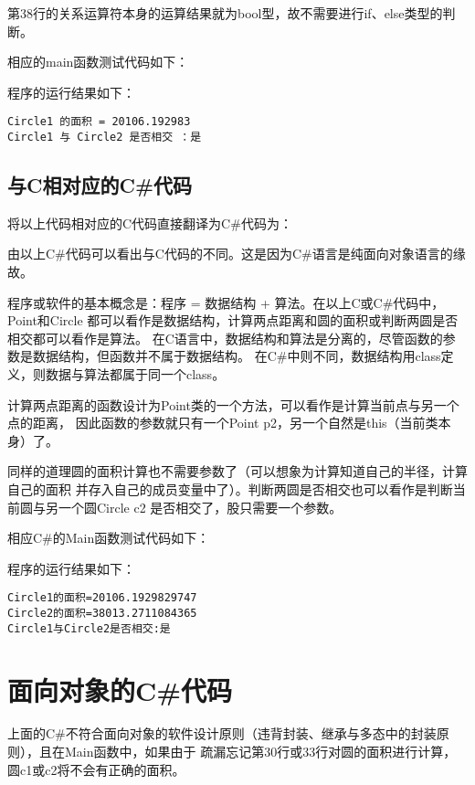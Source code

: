 第38行的关系运算符本身的运算结果就为bool型，故不需要进行if、else类型的判断。

相应的main函数测试代码如下：



程序的运行结果如下：
\begin{verbatim}
Circle1 的面积 = 20106.192983
Circle1 与 Circle2 是否相交 ：是
\end{verbatim}


\subsection{与C相对应的C\#代码}

将以上代码相对应的C代码直接翻译为C\#代码为：



由以上C\#代码可以看出与C代码的不同。这是因为C\#语言是纯面向对象语言的缘故。

程序或软件的基本概念是：程序 = 数据结构 + 算法。在以上C或C\#代码中，Point和Circle
都可以看作是数据结构，计算两点距离和圆的面积或判断两圆是否相交都可以看作是算法。
在C语言中，数据结构和算法是分离的，尽管函数的参数是数据结构，但函数并不属于数据结构。
在C\#中则不同，数据结构用class定义，则数据与算法都属于同一个class。

计算两点距离的函数设计为Point类的一个方法，可以看作是计算当前点与另一个点的距离，
因此函数的参数就只有一个Point p2，另一个自然是this（当前类本身）了。

同样的道理圆的面积计算也不需要参数了（可以想象为计算知道自己的半径，计算自己的面积
并存入自己的成员变量中了）。判断两圆是否相交也可以看作是判断当前圆与另一个圆Circle c2
是否相交了，股只需要一个参数。

相应C\#的Main函数测试代码如下：



程序的运行结果如下：
\begin{verbatim}
Circle1的面积=20106.1929829747
Circle2的面积=38013.2711084365
Circle1与Circle2是否相交:是
\end{verbatim}

\section{面向对象的C\#代码}
上面的C\#不符合面向对象的软件设计原则（违背封装、继承与多态中的封装原则），且在Main函数中，如果由于
疏漏忘记第30行或33行对圆的面积进行计算，圆c1或c2将不会有正确的面积。

